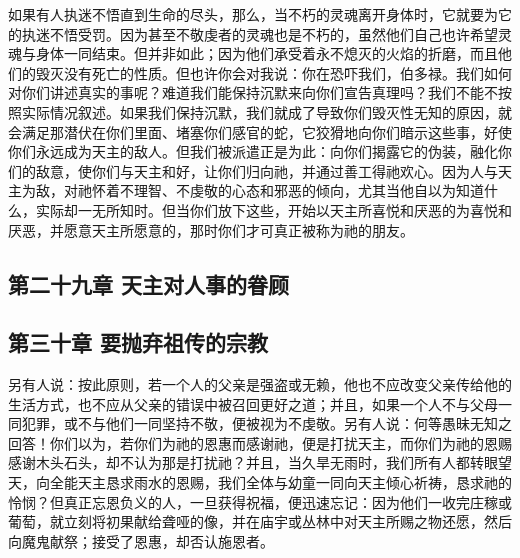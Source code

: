 如果有人执迷不悟直到生命的尽头，那么，当不朽的灵魂离开身体时，它就要为它的执迷不悟受罚。因为甚至不敬虔者的灵魂也是不朽的，虽然他们自己也许希望灵魂与身体一同结束。但并非如此；因为他们承受着永不熄灭的火焰的折磨，而且他们的毁灭没有死亡的性质。但也许你会对我说：你在恐吓我们，伯多禄。我们如何对你们讲述真实的事呢？难道我们能保持沉默来向你们宣告真理吗？我们不能不按照实际情况叙述。如果我们保持沉默，我们就成了导致你们毁灭性无知的原因，就会满足那潜伏在你们里面、堵塞你们感官的蛇，它狡猾地向你们暗示这些事，好使你们永远成为天主的敌人。但我们被派遣正是为此：向你们揭露它的伪装，融化你们的敌意，使你们与天主和好，让你们归向祂，并通过善工得祂欢心。因为人与天主为敌，对祂怀着不理智、不虔敬的心态和邪恶的倾向，尤其当他自以为知道什么，实际却一无所知时。但当你们放下这些，开始以天主所喜悦和厌恶的为喜悦和厌恶，并愿意天主所愿意的，那时你们才可真正被称为祂的朋友。\par


\subsection{第二十九章 天主对人事的眷顾}

\par


\subsection{第三十章 要抛弃祖传的宗教}

另有人说：按此原则，若一个人的父亲是强盗或无赖，他也不应改变父亲传给他的生活方式，也不应从父亲的错误中被召回更好之道；并且，如果一个人不与父母一同犯罪，或不与他们一同坚持不敬，便被视为不虔敬。另有人说：何等愚昧无知之回答！你们以为，若你们为祂的恩惠而感谢祂，便是打扰天主，而你们为祂的恩赐感谢木头石头，却不认为那是打扰祂？并且，当久旱无雨时，我们所有人都转眼望天，向全能天主恳求雨水的恩赐，我们全体与幼童一同向天主倾心祈祷，恳求祂的怜悯？但真正忘恩负义的人，一旦获得祝福，便迅速忘记：因为他们一收完庄稼或葡萄，就立刻将初果献给聋哑的像，并在庙宇或丛林中对天主所赐之物还愿，然后向魔鬼献祭；接受了恩惠，却否认施恩者。\par

